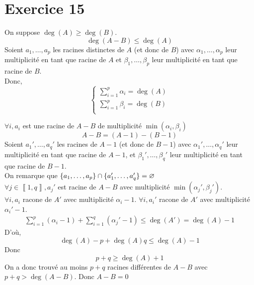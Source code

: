 \part{Exercice 15}

On suppose $\deg(A) \ge \deg(B)$. \[
	\deg(A - B) \le \deg(A)
\]
Soient $a_1, \ldots, a_p$ les racines distinctes de $A$ (et donc de $B$) avec $\alpha_1, \ldots, \alpha_p$ leur multiplicité en tant que racine de $A$ et $\beta_1, \ldots, \beta_p$ leur multiplicité en tant que racine de $B$.\\
Donc, \[
	\begin{cases}
		\sum_{i=1}^p \alpha_i = \deg(A)\\
		\sum_{i=1}^p \beta_i = \deg(B)\\
	\end{cases}
\]

$\forall i, a_i$ est une racine de $A - B$ de multiplicité $\min(\alpha_i, \beta_i)$ \[
	A - B = (A - 1) - (B - 1)
\] Soient $a_1', \ldots, a_q'$ les racines de $A - 1$ (et donc de $B-1$) avec $\alpha_1', \ldots, \alpha_q'$ leur multiplicité en tant que racine de $A - 1$, et $\beta_1', \ldots, \beta_q'$ leur multiplicité en tant que racine de $B - 1$.\\
On remarque que $\{a_1, \ldots, a_p\} \cap \{a_1', \ldots, a_q'\} = \varnothing$ \\

$\forall j \in \left\llbracket 1,q \right\rrbracket, a_j'$ est racine de $A - B$ avec multiplicité $\min(\alpha_j', \beta_j')$.\\
$\forall i, a_i$ racone de $A'$ avec multiplicité $\alpha_i - 1$.
$\forall i, a_i'$ racone de $A'$ avec multiplicité $\alpha_i' - 1$.
\begin{align*}
	\sum_{i=1}^p (\alpha_i - 1) + \sum_{i=1}^q (\alpha_j' - 1) \le \deg(A') = \deg(A) - 1
\end{align*}
D'où, \[
	\deg(A) - p + \deg(A) q \le \deg(A) - 1
\] Donc \[
	p + q \ge \deg(A) + 1
\] On a donc trouvé au moins $p+q$ racines différentes de $A - B$ avec $ p + q > \deg(A - B)$. Donc $A - B = 0$
